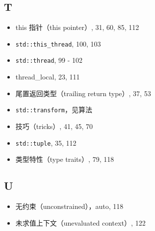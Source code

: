 \subsection{T}

\begin{itemize}
\item this 指针（this pointer）, 31, 60, 85, 112
\item \texttt{std::this\_thread}, 100, 103
\item \texttt{std::thread}, 99 - 102
\item thread\_local, 23, 111
\item 尾置返回类型（trailing return type）, 37, 53
\item \texttt{std::transform}，见算法
\item 技巧（tricks）, 41, 45, 70
\item \texttt{std::tuple}, 35, 112
\item 类型特性（type traits）, 79, 118
\end{itemize}

\subsection{U}

\begin{itemize}
\item 无约束（unconstrained），auto, 118
\item 未求值上下文（unevaluated context）, 122
\end{itemize}

